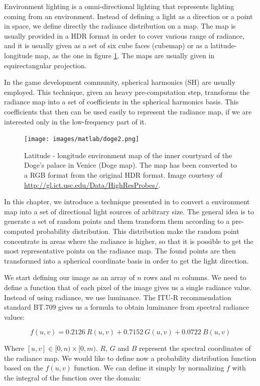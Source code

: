 Environment lighting is a omni-directional lighting that represents lighting coming from an environment. Instead of defining a light as a direction or a point in space, we define directly the radiance distribution on a map. The map is usually provided in a HDR format in order to cover various range of radiance, and it is usually given as a set of six cube faces (cubemap) or as a latitude-longitude map, as the one in figure \ref{fig:doge}. The maps are usually given in equirectangular projection.

In the game development community, spherical harmonics (SH) \citep{green,peterpikeconference} are usually employed. This technique, given an heavy pre-computation step, transforms the radiance map into a set of coefficients in the spherical harmonics basis. This coefficients that then can be used easily to represent the radiance map, if we are interested only in the low-frequency part of it. 

\begin{figure}[!ht]
\centering
\texttt{[image: images/matlab/doge2.png]}
\caption{Latitude - longitude environment map of the inner courtyard of the Doge's palace in Venice (Doge map). The map has been converted to a RGB format from the original HDR format. Image courtesy of \url{http://gl.ict.usc.edu/Data/HighResProbes/}.}
\label{fig:doge}
\end{figure}

In this chapter, we introduce a technique presented in \cite{Pharr:2004:PBR:975275} to convert a environment map into a set of directional light sources of arbitrary size. The general idea is to generate a set of random points and them transform them according to a pre-computed probability distribution. This distribution make the random point concentrate in areas where the radiance is higher, so that it is possible to get the most representative points on the radiance map. The found points are then transformed into a spherical coordinate basis in order to get the light direction.

We start defining our image as an array of $n$ rows and $m$ columns. We need to define a function that of each pixel of the image gives us a single radiance value. Instead of using radiance, we use luminance. The ITU-R recommendation standard BT.709\citep{BT.709-2} gives us a formula to obtain luminance from spectral radiance values:

$$
f(u,v) = 0.2126\ R(u,v) + 0.7152\ G(u,v) + 0.0722\ B(u,v)
$$

Where $[u,v] \in [0,n)\times [0,m)$. $R$, $G$ and $B$ represent the spectral coordinates of the radiance map. We would like to define now a probability distribution function based on the $f(u,v)$ function. We can define it simply by normalizing $f$ with the integral of the function over the domain:

